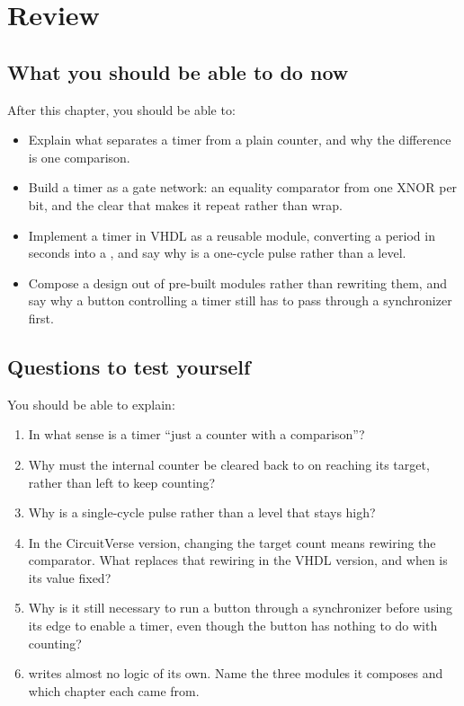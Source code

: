 
\section{Review}
\label{c7:sec:review}

\subsection*{What you should be able to do now}
After this chapter, you should be able to:
\begin{itemize}
  \item Explain what separates a timer from a plain counter, and why the difference is one
    comparison.
  \item Build a timer as a gate network: an equality comparator from one XNOR per bit, and the
    clear that makes it repeat rather than wrap.
  \item Implement a timer in VHDL as a reusable module, converting a period in seconds into a
    , and say why  is a one-cycle pulse rather than a level.
  \item Compose a design out of pre-built modules rather than rewriting them, and say why a button
    controlling a timer still has to pass through a synchronizer first.
\end{itemize}

\subsection*{Questions to test yourself}
You should be able to explain:
\begin{enumerate}
  \item In what sense is a timer ``just a counter with a comparison''?
  \item Why must the internal counter be cleared back to  on reaching its target, rather
    than left to keep counting?
  \item Why is  a single-cycle pulse rather than a level that stays high?
  \item In the CircuitVerse version, changing the target count means rewiring the comparator. What
    replaces that rewiring in the VHDL version, and when is its value fixed?
  \item Why is it still necessary to run a button through a synchronizer before using its edge to
    enable a timer, even though the button has nothing to do with counting?
  \item {} writes almost no logic of its own. Name the three modules it composes
    and which chapter each came from.
\end{enumerate}

